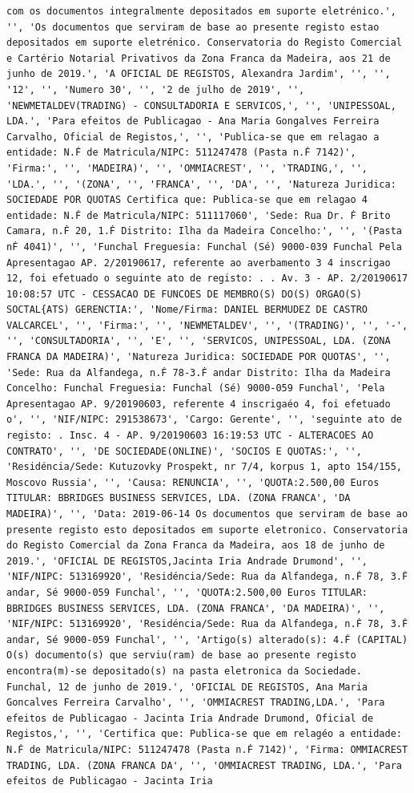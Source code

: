 \documentclass[
  12pt,
]{article}
\begin{document}
\begin{verbatim}
com os documentos integralmente depositados em suporte eletrénico.', '', 'Os documentos que serviram de base ao presente registo estao depositados em suporte eletrénico. Conservatoria do Registo Comercial e Cartério Notarial Privativos da Zona Franca da Madeira, aos 21 de junho de 2019.', 'A OFICIAL DE REGISTOS, Alexandra Jardim', '', '', '12', '', 'Numero 30', '', '2 de julho de 2019', '', 'NEWMETALDEV(TRADING) - CONSULTADORIA E SERVICOS,', '', 'UNIPESSOAL, LDA.', 'Para efeitos de Publicagao - Ana Maria Gongalves Ferreira Carvalho, Oficial de Registos,', '', 'Publica-se que em relagao a entidade: N.Ḟ de Matricula/NIPC: 511247478 (Pasta n.Ḟ 7142)', 'Firma:', '', 'MADEIRA)', '', 'OMMIACREST', '', 'TRADING,', '', 'LDA.', '', '(ZONA', '', 'FRANCA', '', 'DA', '', 'Natureza Juridica: SOCIEDADE POR QUOTAS Certifica que: Publica-se que em relagao 4 entidade: N.Ḟ de Matricula/NIPC: 511117060', 'Sede: Rua Dr. Ḟ Brito Camara, n.Ḟ 20, 1.Ḟ Distrito: Ilha da Madeira Concelho:', '', '(Pasta nḞ 4041)', '', 'Funchal Freguesia: Funchal (Sé) 9000-039 Funchal Pela Apresentagao AP. 2/20190617, referente ao averbamento 3 4 inscrigao 12, foi efetuado o seguinte ato de registo: . . Av. 3 - AP. 2/20190617 10:08:57 UTC - CESSACAO DE FUNCOES DE MEMBRO(S) DO(S) ORGAO(S) SOCTAL{ATS) GERENCTIA:', 'Nome/Firma: DANIEL BERMUDEZ DE CASTRO VALCARCEL', '', 'Firma:', '', 'NEWMETALDEV', '', '(TRADING)', '', '-', '', 'CONSULTADORIA', '', 'E', '', 'SERVICOS, UNIPESSOAL, LDA. (ZONA FRANCA DA MADEIRA)', 'Natureza Juridica: SOCIEDADE POR QUOTAS', '', 'Sede: Rua da Alfandega, n.Ḟ 78-3.Ḟ andar Distrito: Ilha da Madeira Concelho: Funchal Freguesia: Funchal (Sé) 9000-059 Funchal', 'Pela Apresentagao AP. 9/20190603, referente 4 inscrigaéo 4, foi efetuado o', '', 'NIF/NIPC: 291538673', 'Cargo: Gerente', '', 'seguinte ato de registo: . Insc. 4 - AP. 9/20190603 16:19:53 UTC - ALTERACOES AO CONTRATO', '', 'DE SOCIEDADE(ONLINE)', 'SOCIOS E QUOTAS:', '', 'Residéncia/Sede: Kutuzovky Prospekt, nr 7/4, korpus 1, apto 154/155, Moscovo Russia', '', 'Causa: RENUNCIA', '', 'QUOTA:2.500,00 Euros TITULAR: BBRIDGES BUSINESS SERVICES, LDA. (ZONA FRANCA', 'DA MADEIRA)', '', 'Data: 2019-06-14 Os documentos que serviram de base ao presente registo esto depositados em suporte eletronico. Conservatoria do Registo Comercial da Zona Franca da Madeira, aos 18 de junho de 2019.', 'OFICIAL DE REGISTOS,Jacinta Iria Andrade Drumond', '', 'NIF/NIPC: 513169920', 'Residéncia/Sede: Rua da Alfandega, n.Ḟ 78, 3.Ḟ andar, Sé 9000-059 Funchal', '', 'QUOTA:2.500,00 Euros TITULAR: BBRIDGES BUSINESS SERVICES, LDA. (ZONA FRANCA', 'DA MADEIRA)', '', 'NIF/NIPC: 513169920', 'Residéncia/Sede: Rua da Alfandega, n.Ḟ 78, 3.Ḟ andar, Sé 9000-059 Funchal', '', 'Artigo(s) alterado(s): 4.Ḟ (CAPITAL) O(s) documento(s) que serviu(ram) de base ao presente registo encontra(m)-se depositado(s) na pasta eletronica da Sociedade. Funchal, 12 de junho de 2019.', 'OFICIAL DE REGISTOS, Ana Maria Goncalves Ferreira Carvalho', '', 'OMMIACREST TRADING,LDA.', 'Para efeitos de Publicagao - Jacinta Iria Andrade Drumond, Oficial de Registos,', '', 'Certifica que: Publica-se que em relagéo a entidade: N.Ḟ de Matricula/NIPC: 511247478 (Pasta n.Ḟ 7142)', 'Firma: OMMIACREST TRADING, LDA. (ZONA FRANCA DA', '', 'OMMIACREST TRADING, LDA.', 'Para efeitos de Publicagao - Jacinta Iria 
\end{verbatim}
\end{document}
